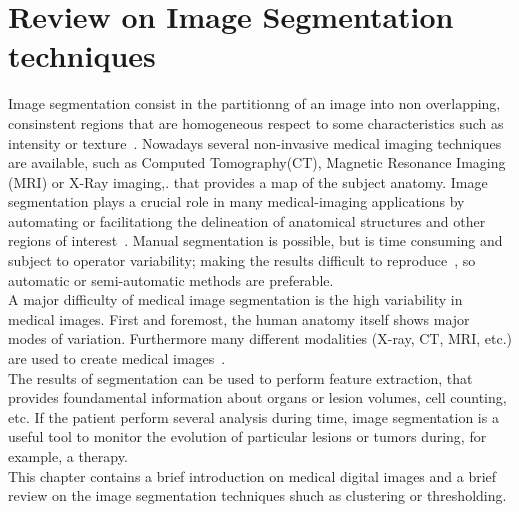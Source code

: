 \documentclass{standalone}
\begin{document}
	\chapter{Review on Image Segmentation techniques}
	Image segmentation consist in the partitionng of an image into non overlapping, consinstent regions that are homogeneous respect to some characteristics such as intensity or texture~\cite{ART:Pham}.
	Nowadays several non-invasive medical imaging techniques are available, such as Computed Tomography(CT), Magnetic Resonance Imaging (MRI) or X-Ray imaging,. that provides a map of the subject anatomy. Image segmentation plays a crucial role in many medical-imaging applications by automating or facilitationg the delineation of anatomical structures and other regions of interest~\cite{ART:Pham}.  Manual segmentation is  possible, but is time consuming and subject to operator variability; making the results difficult to reproduce~\cite{INP:Withey}, so automatic or semi-automatic methods are preferable. \\
	A major difficulty of medical image segmentation is the high variability in medical images. First and foremost, the human anatomy itself shows major modes of variation. Furthermore many different modalities (X-ray, CT, MRI, etc.) are used to create medical images~\cite{ART:Pooja}.\\
	The results of segmentation can be used to perform feature extraction, that provides foundamental information about organs or lesion volumes, cell counting, etc. If the patient perform several analysis during time, image segmentation is a useful tool to monitor the evolution of particular lesions or tumors during, for example, a therapy.\\
	
	This chapter contains a brief introduction on medical digital images and a brief review on the image segmentation techniques shuch as clustering or thresholding. 
	
\end{document}
